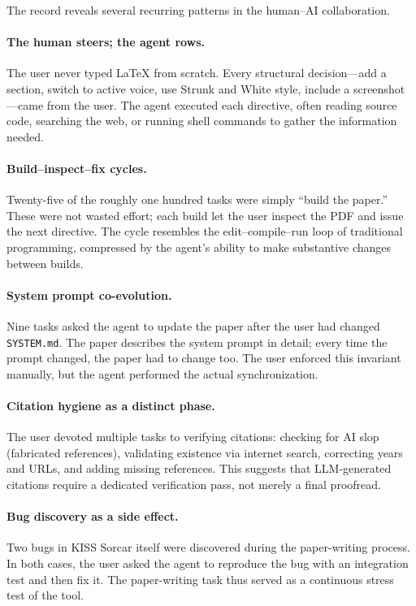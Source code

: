 \documentclass{article}
\begin{document}
The record reveals several recurring patterns in the human--AI collaboration.

\paragraph{The human steers; the agent rows.}  The user never typed \LaTeX{} from scratch.  Every structural decision---add a section, switch to active voice, use Strunk and White style, include a screenshot---came from the user.  The agent executed each directive, often reading source code, searching the web, or running shell commands to gather the information needed.

\paragraph{Build--inspect--fix cycles.}  Twenty-five of the roughly one hundred tasks were simply ``build the paper.''  These were not wasted effort; each build let the user inspect the PDF and issue the next directive.  The cycle resembles the edit--compile--run loop of traditional programming, compressed by the agent's ability to make substantive changes between builds.

\paragraph{System prompt co-evolution.}  Nine tasks asked the agent to update the paper after the user had changed \texttt{SYSTEM.md}.  The paper describes the system prompt in detail; every time the prompt changed, the paper had to change too.  The user enforced this invariant manually, but the agent performed the actual synchronization.

\paragraph{Citation hygiene as a distinct phase.}  The user devoted multiple tasks to verifying citations: checking for AI slop (fabricated references), validating existence via internet search, correcting years and URLs, and adding missing references.  This suggests that LLM-generated citations require a dedicated verification pass, not merely a final proofread.

\paragraph{Bug discovery as a side effect.}  Two bugs in KISS Sorcar itself were discovered during the paper-writing process.  In both cases, the user asked the agent to reproduce the bug with an integration test and then fix it.  The paper-writing task thus served as a continuous stress test of the tool.
\end{document}

